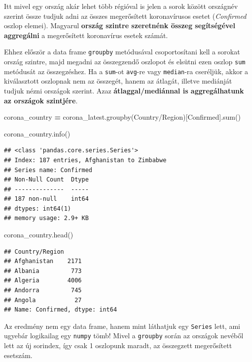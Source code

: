 \documentclass[
]{book}
\newenvironment{Shaded}{\begin{snugshade}}{\end{snugshade}}
\newcommand{\BuiltInTok}[1]{#1}
\newcommand{\NormalTok}[1]{#1}
\newcommand{\OperatorTok}[1]{\textcolor[rgb]{0.81,0.36,0.00}{\textbf{#1}}}
\newcommand{\StringTok}[1]{\textcolor[rgb]{0.31,0.60,0.02}{#1}}
\begin{document}
Itt mivel egy ország akár lehet több régióval is jelen a sorok között országnév szerint össze tudjuk adni az összes megerősített koronavírusos esetet (\emph{Confirmed} oszlop elemei). Magyarul \textbf{ország szintre szeretnénk összeg segítségével aggregálni} a megerősített koronavírus esetek számát.

Ehhez először a data frame \texttt{groupby} metódusával csoportosítani kell a sorokat ország szintre, majd megadni az összegzendő oszlopot és elsütni ezen oszlop \texttt{sum} metódusát az összegzéshez. Ha a \texttt{sum}-ot \texttt{avg}-re vagy \texttt{median}-ra cseréljük, akkor a kiválasztott oszlopnak nem az összegét, hanem az átlagát, illetve mediánját tudjuk nézni országok szerint. Azaz \textbf{átlaggal/mediánnal is aggregálhatunk az országok szintjére}.

\begin{Shaded}
\begin{Highlighting}[]
\NormalTok{corona\_country }\OperatorTok{=}\NormalTok{ corona\_latest.groupby(}\StringTok{\textquotesingle{}Country/Region\textquotesingle{}}\NormalTok{)[}\StringTok{\textquotesingle{}Confirmed\textquotesingle{}}\NormalTok{].}\BuiltInTok{sum}\NormalTok{()}

\NormalTok{corona\_country.info()}
\end{Highlighting}
\end{Shaded}

\begin{verbatim}
## <class 'pandas.core.series.Series'>
## Index: 187 entries, Afghanistan to Zimbabwe
## Series name: Confirmed
## Non-Null Count  Dtype
## --------------  -----
## 187 non-null    int64
## dtypes: int64(1)
## memory usage: 2.9+ KB
\end{verbatim}

\begin{Shaded}
\begin{Highlighting}[]
\NormalTok{corona\_country.head()}
\end{Highlighting}
\end{Shaded}

\begin{verbatim}
## Country/Region
## Afghanistan    2171
## Albania         773
## Algeria        4006
## Andorra         745
## Angola           27
## Name: Confirmed, dtype: int64
\end{verbatim}

Az eredmény nem egy data frame, hanem mint láthatjuk egy \texttt{Series} lett, ami ugyebár logikailag egy \texttt{numpy} tömb! Mivel a \texttt{groupby} során az országok nevéből lett az új sorindex, így csak 1 oszlopunk maradt, az összegzett megerősített esetszám.
\end{document}
